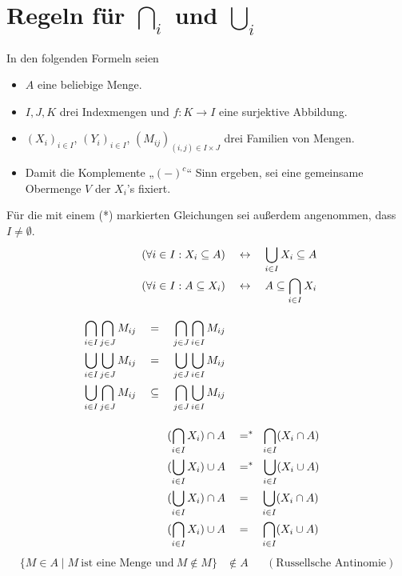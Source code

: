 \section{Regeln für $\bigcap_i$ und $\bigcup_i$} \label{anhang:bigcapcupregeln}
In den folgenden Formeln seien
\begin{itemize}
    \item $A$ eine beliebige Menge.
    \item $I,J,K$ drei Indexmengen und $f:K\to I$ eine surjektive Abbildung.
    \item $(X_i)_{i\in I}$, $(Y_i)_{i\in I}$, $(M_{ij})_{(i,j)\in I\times J}$ drei Familien von Mengen.
    \item Damit die Komplemente „$(-)^c$“ Sinn ergeben, sei eine gemeinsame Obermenge $V$ der $X_i$'s fixiert.
\end{itemize}
Für die mit einem (*) markierten Gleichungen sei außerdem angenommen, dass $I\neq\emptyset$.
\begingroup
\allowdisplaybreaks
\begin{align*}
    (\forall i\in I : X_i \subseteq A) & \quad\leftrightarrow\quad \bigcup_{i\in I} X_i \subseteq A \\
    (\forall i\in I : A\subseteq X_i) & \quad\leftrightarrow\quad A \subseteq \bigcap_{i\in I} X_i \\[1em]
    \begin{split}
    \bigcap_{i\in I} \bigcap_{j\in J} M_{ij} & \quad =\quad \bigcap_{j\in J}\bigcap_{i\in I} M_{ij} \\
    \bigcup_{i\in I} \bigcup_{j\in J} M_{ij} & \quad =\quad \bigcup_{j\in J}\bigcup_{i\in I} M_{ij} \\
    \bigcup_{i\in I}\bigcap_{j\in J} M_{ij} & \quad\subseteq\quad \bigcap_{j\in J}\bigcup_{i\in I} M_{ij}
    \end{split} && \\[1em]
    (\bigcap_{i\in I} X_i) \cap A & \quad =^* \quad\hspace{-.4em} \bigcap_{i \in I} (X_i \cap A) \\
    (\bigcup_{i\in I} X_i) \cup A & \quad =^* \quad\hspace{-.4em} \bigcup_{i\in I} (X_i \cup A) \\
    (\bigcup_{i\in I} X_i) \cap A & \quad =\quad \bigcup_{i\in I} (X_i \cap A) \\
    (\bigcap_{i\in I} X_i) \cup A & \quad =\quad \bigcap_{i\in I} (X_i \cup A) %
\end{align*}
\begin{align*}
    \{ M\in A\mid M\ \text{ist eine Menge und}\ M\notin M \} & \notin A && (\text{Russellsche Antinomie})
\end{align*}
